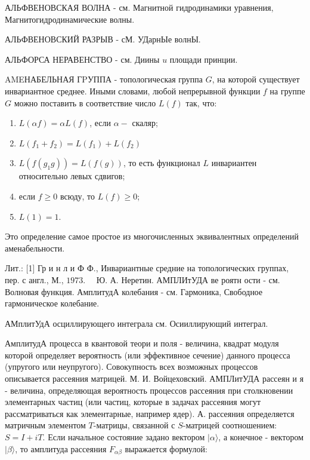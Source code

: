 \documentclass[10pt]{article}
\begin{document}
АЛЬФВЕНОВСКАЯ ВОЛНА - см. Магнитной гидродинамики уравнения, Магнитогидродинамические волны.



АЛЬФВЕНОВСКИЙ РАЗРЫВ - сМ. УДарнЫе волнЫ.



АЛЬФОРСА НЕРАВЕНСТВО - см. Диины $u$ площади принции.



AMEНАБЕЛЬНАЯ ГPУППА - топологическая группа $G$, на которой существует инвариантное среднее. Иными словами, любой непрерывной функции $f$ на группе $G$ можно поставить в соответствие число $L(f)$ так, что:



\begin{enumerate}

  \item $L(\alpha f)=\alpha L(f)$, если $\alpha-$ скаляр;



  \item $L\left(f_{1}+f_{2}\right)=L\left(f_{1}\right)+L\left(f_{2}\right)$



  \item $L\left(f\left(g_{1} g\right)\right)=L(f(g))$, то есть функционал $L$ инвариантен относительно левых сдвигов;



  \item если $f \geqslant 0$ всюду, то $L(f) \geqslant 0$;



  \item $L(1)=1$.



\end{enumerate}



Это определение самое простое из многочисленных эквивалентных определений аменабельности.



Лит.: [1] Гр и н л и Ф Ф., Инвариантные средние на топологических группах, пер. с англ., М., $1973 . \quad$ Ю. А. Неретин. АМПЛИтУДА ве роятн ости - см. Волновая функция. АмплитудА колебания - см. Гармоника, Свободное гармоническое колебание.



АМплитУдА осциллирующего интеграла см. Осииллирующий интеграл.



АмплитудА процесса в квантовой теори и поля - величина, квадрат модуля которой определяет вероятность (или эффективное сечение) данного процесса (упругого или неупругого). Совокупность всех возможных процессов описывается рассеяния матрицей. М. И. Войцеховский. АМПЛитУДА рассеян и я - величина, определяющая вероятность процессов рассеяния при столкновении элементарных частиц (или частиц, которые в задачах рассеяния могут рассматриваться как элементарные, например ядер). А. рассеяния определяется матричным элементом $T$-матрицы, связанной с $S$-матрицей соотношением: $S=I+i T$. Если начальное состояние задано вектором $|\alpha\rangle$, а конечное - вектором $|\beta\rangle$, то амплитуда рассеяния $F_{\alpha \beta}$ выражается формулой:
\end{document}
